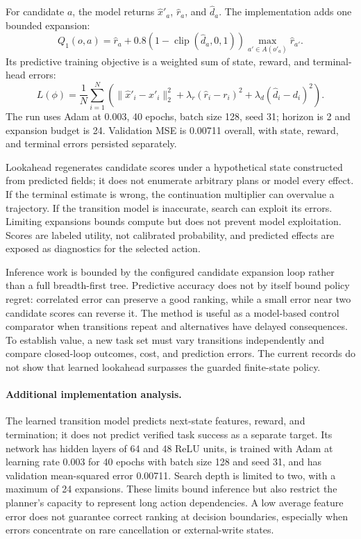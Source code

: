 For candidate $a$, the model returns $\widehat x'_a$, $\widehat r_a$, and $\widehat d_a$. The implementation adds one bounded expansion:
\begin{equation}
Q_1(o,a)=\widehat r_a+0.8(1-\operatorname{clip}(\widehat d_a,0,1))
\max_{a'\in A(o'_a)}\widehat r_{a'}.
\end{equation}
Its predictive training objective is a weighted sum of state, reward, and terminal-head errors:
\begin{equation}
L(\phi)=\frac{1}{N}\sum_{i=1}^N\left(\|\widehat x'_i-x'_i\|_2^2+
\lambda_r(\widehat r_i-r_i)^2+\lambda_d(\widehat d_i-d_i)^2\right).
\end{equation}
The run uses Adam at 0.003, 40 epochs, batch size 128, seed 31; horizon is 2 and expansion budget is 24. Validation MSE is 0.00711 overall, with state, reward, and terminal errors persisted separately.

Lookahead regenerates candidate scores under a hypothetical state constructed from predicted fields; it does not enumerate arbitrary plans or model every effect. If the terminal estimate is wrong, the continuation multiplier can overvalue a trajectory. If the transition model is inaccurate, search can exploit its errors. Limiting expansions bounds compute but does not prevent model exploitation. Scores are labeled utility, not calibrated probability, and predicted effects are exposed as diagnostics for the selected action.

Inference work is bounded by the configured candidate expansion loop rather than a full breadth-first tree. Predictive accuracy does not by itself bound policy regret: correlated error can preserve a good ranking, while a small error near two candidate scores can reverse it. The method is useful as a model-based control comparator when transitions repeat and alternatives have delayed consequences. To establish value, a new task set must vary transitions independently and compare closed-loop outcomes, cost, and prediction errors. The current records do not show that learned lookahead surpasses the guarded finite-state policy.


\paragraph{Additional implementation analysis.} The learned transition model predicts next-state features, reward, and termination; it does not predict verified task success as a separate target. Its network has hidden layers of 64 and 48 ReLU units, is trained with Adam at learning rate 0.003 for 40 epochs with batch size 128 and seed 31, and has validation mean-squared error 0.00711. Search depth is limited to two, with a maximum of 24 expansions. These limits bound inference but also restrict the planner's capacity to represent long action dependencies. A low average feature error does not guarantee correct ranking at decision boundaries, especially when errors concentrate on rare cancellation or external-write states.

